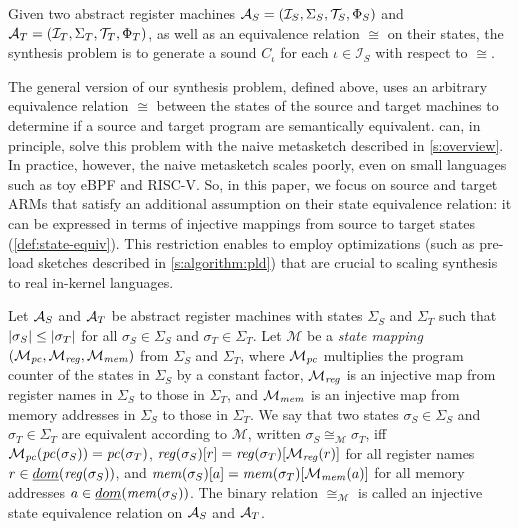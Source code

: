 \begin{definition}\label{def:synthesis-problem}  
Given two abstract register machines $\mathcal{A}_S = (\mathcal{I}_S, \Sigma_S,
\mathcal{T}_S, \Phi_S)$ and $\mathcal{A}_T=(\mathcal{I}_T, \Sigma_T,  \mathcal{T}_T, \Phi_T)$, as well
as an equivalence relation $\cong$ on their states, the \textup{\minicompiler
synthesis problem} is to generate a sound \minicompiler $C_\iota$ for each
$\iota\in\mathcal{I}_S$ with respect to $\cong$.\tighten
\end{definition} 

The general version of our synthesis problem, defined above, uses an arbitrary
equivalence relation $\cong$ between the states of the source and target
machines to determine if a source and target program are semantically
equivalent. \jitsynth can, in principle, solve this problem with the naive
metasketch described in \autoref{s:overview}. In practice, however, the naive
metasketch scales poorly, even on small languages such as toy eBPF and RISC-V\@.
So, in this paper, we focus on source and target ARMs that satisfy an additional
assumption on their state equivalence relation: it can be expressed in terms of
injective mappings from source to target states (\autoref{def:state-equiv}).
This restriction enables \jitsynth to employ optimizations (such as pre-load
sketches described in \autoref{s:algorithm:pld}) that are crucial to scaling
synthesis to real in-kernel languages.\tighten


\begin{definition}\label{def:state-equiv}
Let $\mathcal{A}_S$ and $\mathcal{A}_T$ be abstract register machines with states $\Sigma_S$
and $\Sigma_T$ such that $|\sigma_S|\leq|\sigma_T|$ for all
$\sigma_S\in\Sigma_S$ and $\sigma_T\in\Sigma_T$. Let $\mathcal{M}$ be a
\emph{state mapping} $(\mathcal{M}_\mathit{pc}, \mathcal{M}_\mathit{reg}, \mathcal{M}_\mathit{mem})$
from $\Sigma_S$ and $\Sigma_T$,  where $\mathcal{M}_\mathit{pc}$ multiplies the program
counter of the states in $\Sigma_S$ by a constant factor, $\mathcal{M}_\mathit{reg}$ is
an injective map from register names in $\Sigma_S$ to those in $\Sigma_T$, and
$\mathcal{M}_\mathit{mem}$ is an injective map from memory addresses in $\Sigma_S$ to
those in $\Sigma_T$. We say that two states  $\sigma_S\in\Sigma_S$ and
$\sigma_T\in\Sigma_T$ are equivalent according to $\mathcal{M}$, written
$\sigma_S \cong_\mathcal{M} \sigma_T$, iff $\mathcal{M}_\mathit{pc}(\mathit{pc}(\sigma_S)) =
\mathit{pc}(\sigma_T)$, $\mathit{reg}(\sigma_S)[r] = \mathit{reg}(\sigma_T)[\mathcal{M_\mathit{reg}}(r)]$ for
all register names $r\in\emph{dom}(\mathit{reg}(\sigma_S))$, and $\mathit{mem}(\sigma_S)[a] =
\mathit{mem}(\sigma_T)[\mathcal{M_\mathit{mem}}(a)]$ for all memory addresses
$a\in\emph{dom}(\mathit{mem}(\sigma_S))$. The binary relation $\cong_\mathcal{M}$ is
called an \textup{injective state equivalence relation} on $\mathcal{A}_S$ and
$\mathcal{A}_T$.
\end{definition}


